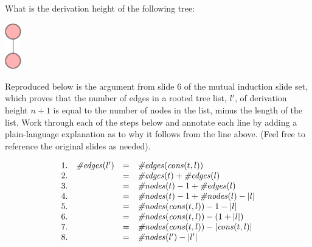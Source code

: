 \documentclass[]{exam}
\theoremstyle{definition}
\newcommand{\id}[1]{\mbox{\it #1\/}}
\begin{document}
\begin{questions}
\question What is the derivation height of the following tree:  

\begin{center}
\includegraphics[height=2cm]{art/2nodetree.eps}%
\end{center}
\clearpage
\question Reproduced below is the argument from slide $6$ of the mutual
induction slide set, which proves that the number of edges in a rooted
tree list, $l'$, of derivation height $n + 1$ is equal to the number of nodes
in the list, minus the length of the list. Work through each of the
steps below and annotate each line by adding a plain-language explanation as to 
why it follows from the line above. (Feel free to reference the original slides
as needed).

\begin{displaymath}
\begin{array}{llll}
1. & \id{\#edges}(l') & = &\id{\#edges}(\id{cons}(t,l)) \\
2. &  & = & \id{\#edges}(t) + \id{\#edges}(l) \\
3. & 	& = & \id{\#nodes}(t) - 1 + \id{\#edges}(l) \\
4. & 	& = & \id{\#nodes}(t) - 1 + \id{\#nodes}(l) - |l| \\
5. & 	& = & \id{\#nodes}(\id{cons}(t,l)) - 1 - |l| \\
6. & 	& = & \id{\#nodes}(\id{cons}(t,l)) - (1 + |l|) \\
7. & 	& = & \id{\#nodes}(\id{cons}(t,l)) - |\id{cons}(t,l)|\\
8. & 	& = & \id{\#nodes}(l') - |l'|
\end{array}
\end{displaymath}


%
%
%
%



\end{questions}
\end{document}
